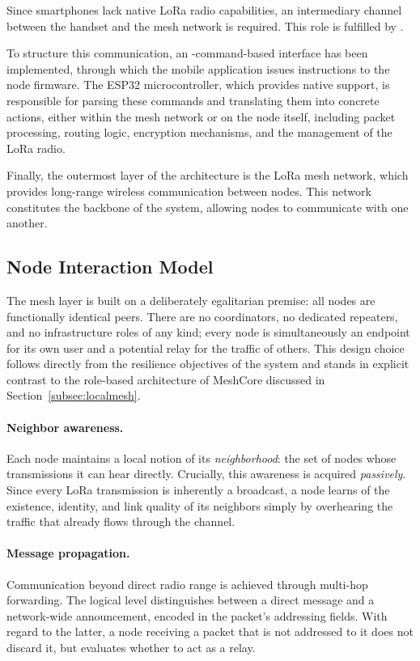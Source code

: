 \documentclass[english,bachelor]{tfgitic}[2026/01/22]
\begin{document}
Since smartphones lack native LoRa radio capabilities, an intermediary channel between the handset and the mesh network is required. This role is fulfilled by .

To structure this communication, an -command-based interface has been implemented, through which the mobile application issues instructions to the node firmware. The ESP32 microcontroller, which provides native  support, is responsible for parsing these commands and translating them into concrete actions, either within the mesh network or on the node itself, including packet processing, routing logic, encryption mechanisms, and the management of the LoRa radio.

Finally, the outermost layer of the architecture is the LoRa mesh network, which provides long-range wireless communication between nodes. This network constitutes the backbone of the system, allowing nodes to communicate with one another.

\subsection{Node Interaction Model}
\label{sec:node_interaction_model}

The mesh layer is built on a deliberately egalitarian premise: all nodes are functionally identical peers. There are no coordinators, no dedicated repeaters, and no infrastructure roles of any kind; every node is simultaneously an endpoint for its own user and a potential relay for the traffic of others. This design choice follows directly from the resilience objectives of the system and stands in explicit contrast to the role-based architecture of MeshCore discussed in Section~\ref{subsec:localmesh}.

\paragraph{Neighbor awareness.} Each node maintains a local notion of its \emph{neighborhood}: the set of nodes whose transmissions it can hear directly. Crucially, this awareness is acquired \emph{passively}. Since every LoRa transmission is inherently a broadcast, a node learns of the existence, identity, and link quality of its neighbors simply by overhearing the traffic that already flows through the channel.

\paragraph{Message propagation.} Communication beyond direct radio range is achieved through multi-hop forwarding. The logical level distinguishes between a direct message and a network-wide announcement, encoded in the packet's addressing fields. With regard to the latter, a node receiving a packet that is not addressed to it does not discard it, but evaluates whether to act as a relay.
\end{document}
